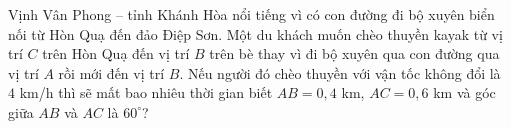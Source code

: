 \begin{bt}%
	Vịnh Vân Phong – tỉnh Khánh Hòa nổi tiếng vì có con đường đi bộ xuyên biển nối từ Hòn Quạ đến đảo Điệp Sơn. Một du khách muốn chèo thuyền kayak từ vị trí $C$ trên Hòn Quạ đến vị trí $B$ trên bè thay vì đi bộ xuyên qua con đường qua vị trí $A$ rồi mới đến vị trí $B$. Nếu người đó chèo thuyền với vận tốc không đổi là $4$ km/h thì sẽ mất bao nhiêu thời gian biết $AB = 0{,}4$ km, $AC = 0{,}6$ km và góc giữa $AB$ và $AC$ là $60^\circ$?
\end{bt}

